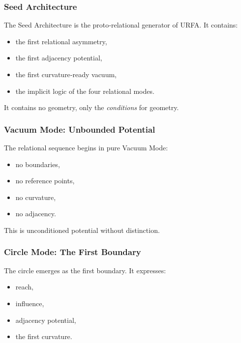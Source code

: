 \subsubsection{Seed Architecture}

The Seed Architecture is the proto‑relational generator of URFA. It contains:

\begin{itemize}
    \item the first relational asymmetry,
    \item the first adjacency potential,
    \item the first curvature‑ready vacuum,
    \item the implicit logic of the four relational modes.
\end{itemize}

It contains no geometry, only the \emph{conditions} for geometry.

\subsubsection{Vacuum Mode: Unbounded Potential}

The relational sequence begins in pure Vacuum Mode:

\begin{itemize}
    \item no boundaries,
    \item no reference points,
    \item no curvature,
    \item no adjacency.
\end{itemize}

This is unconditioned potential without distinction.

\subsubsection{Circle Mode: The First Boundary}

The circle emerges as the first boundary. It expresses:

\begin{itemize}
    \item reach,
    \item influence,
    \item adjacency potential,
    \item the first curvature.
\end{itemize}


